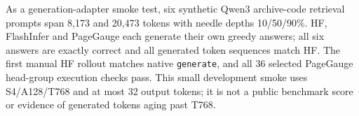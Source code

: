 As a generation-adapter smoke test, six synthetic Qwen3 archive-code retrieval prompts span 8,173 and 20,473 tokens with needle depths 10/50/90\%. HF, FlashInfer and PageGauge each generate their own greedy answers; all six answers are exactly correct and all generated token sequences match HF. The first manual HF rollout matches native \texttt{generate}, and all 36 selected PageGauge head-group execution checks pass. This small development smoke uses S4/A128/T768 and at most 32 output tokens; it is not a public benchmark score or evidence of generated tokens aging past T768.

